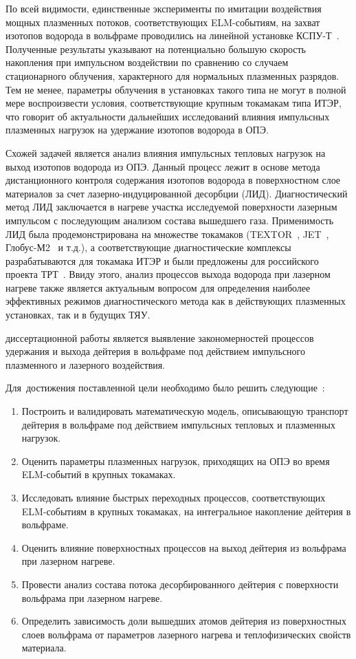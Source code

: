По всей видимости, единственные эксперименты по имитации воздействия мощных плазменных потоков, соответствующих ELM-событиям, на захват изотопов водорода в вольфраме проводились на линейной установке КСПУ-Т~\cite{Ogorodnikova}. Полученные результаты указывают на потенциально большую скорость накопления при импульсном воздействии по сравнению со случаем стационарного облучения, характерного для нормальных плазменных разрядов. Тем не менее, параметры облучения в установках такого типа не могут в полной мере воспроизвести условия, соответствующие крупным токамакам типа ИТЭР, что говорит об актуальности дальнейших исследований влияния импульсных плазменных нагрузок на удержание изотопов водорода в ОПЭ.

Схожей задачей является анализ влияния импульсных тепловых нагрузок на выход изотопов водорода из ОПЭ. Данный процесс лежит в основе метода дистанционного контроля содержания изотопов водорода в поверхностном слое материалов за счет лазерно-индуцированной десорбции (ЛИД). Диагностический метод ЛИД заключается в нагреве участка исследуемой поверхности лазерным импульсом с последующим анализом состава вышедшего газа. Применимость ЛИД была продемонстрирована на множестве токамаков (TEXTOR~\cite{Schweer2009}, JET~\cite{Zlobinski2024}, Глобус-М2~\cite{Medvedev2024} и т.д.), а соответствующие диагностические комплексы разрабатываются для токамака ИТЭР и были предложены для российского проекта ТРТ~\cite{Razdobarin2022}. Ввиду этого, анализ процессов выхода водорода при лазерном нагреве также является актуальным вопросом для определения наиболее эффективных режимов диагностического метода как в действующих плазменных установках, так и в будущих ТЯУ.

{\aim} диссертационной работы является выявление закономерностей процессов удержания и выхода дейтерия в вольфраме под действием импульсного плазменного и
лазерного воздействия.

Для~достижения поставленной цели необходимо было решить следующие~{\tasks}:
\begin{enumerate}[beginpenalty=10000] %
    \item Построить и валидировать математическую модель, описывающую транспорт дейтерия в вольфраме под действием импульсных тепловых и плазменных нагрузок.
    \item Оценить параметры плазменных нагрузок, приходящих на ОПЭ во время ELM-событий в крупных токамаках.
    \item Исследовать влияние быстрых переходных процессов, соответствующих ELM-событиям в крупных токамаках, на интегральное накопление дейтерия в вольфраме.
    \item Оценить влияние поверхностных процессов на выход дейтерия из вольфрама при лазерном нагреве.
    \item Провести анализ состава потока десорбированного дейтерия с поверхности вольфрама при лазерном нагреве.
    \item Определить зависимость доли вышедших атомов дейтерия из поверхностных слоев вольфрама от параметров лазерного нагрева и теплофизических свойств материала.
\end{enumerate}


